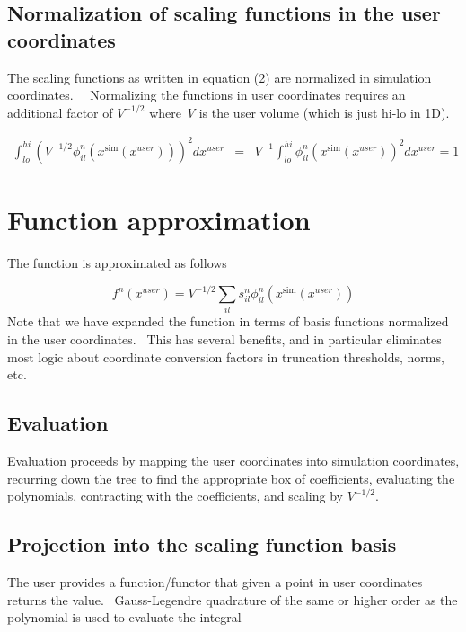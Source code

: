 \documentclass[letterpaper]{article}
\begin{document}
\subsection[Normalization of scaling functions in the user coordinates]{Normalization of scaling functions in the user
coordinates}
The scaling functions as written in equation (2) are normalized in simulation coordinates. \ \ Normalizing the functions
in user coordinates requires an additional factor of  $V^{-1/2}$ where \textit{V }is the user volume (which is just
hi-lo in 1D).

\begin{equation}
\begin{matrix}\int _{\mathrm{{\mathit{lo}}}}^{\mathrm{{\mathit{hi}}}}\left(V^{-1/2}\phi
_{il}^{n}(x^{\mathrm{{sim}}}(x^{\mathrm{{\mathit{user}}}}))\right)^{2}dx^{\mathrm{{\mathit{user}}}}&\text{=}&V^{-1}\int
_{\mathrm{{\mathit{lo}}}}^{\mathrm{{\mathit{hi}}}}\phi
_{il}^{n}(x^{\mathrm{{sim}}}(x^{\mathrm{{\mathit{user}}}}))^{2}dx^{\mathrm{{\mathit{user}}}}=1\end{matrix}
\end{equation}
\section{Function approximation}
The function is approximated as follows 

\begin{equation}\label{seq:refText19}
f^{n}(x^{\mathrm{{\mathit{user}}}})=V^{-1/2}\sum _{il}s_{il}^{n}\phi
_{il}^{n}(x^{\mathrm{{sim}}}(x^{\mathrm{{\mathit{user}}}}))
\end{equation}
Note that we have expanded the function in terms of basis functions normalized in the user coordinates. \ This has
several benefits, and in particular eliminates most logic about coordinate conversion factors in truncation thresholds,
norms, etc.

\subsection{Evaluation}
Evaluation proceeds by mapping the user coordinates into simulation coordinates, recurring down the tree to find the
appropriate box of coefficients, evaluating the polynomials, contracting with the coefficients, and scaling by 
$V^{-1/2}$.

\subsection{Projection into the scaling function basis}
The user provides a function/functor that given a point in user coordinates returns the value. \ Gauss-Legendre
quadrature of the same or higher order as the polynomial is used to evaluate the integral 
\end{document}

